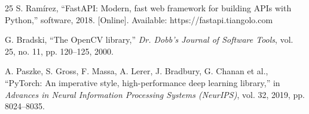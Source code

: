 \documentclass[conference]{IEEEtran}
\begin{document}
\begin{thebibliography}{25}
S. Ram\'irez, ``FastAPI: Modern, fast web framework for building APIs with Python,'' software, 2018. [Online]. Available: https://fastapi.tiangolo.com

G. Bradski, ``The OpenCV library,'' \emph{Dr. Dobb's Journal of Software Tools}, vol. 25, no. 11, pp. 120--125, 2000.

A. Paszke, S. Gross, F. Massa, A. Lerer, J. Bradbury, G. Chanan et al., ``PyTorch: An imperative style, high-performance deep learning library,'' in \emph{Advances in Neural Information Processing Systems (NeurIPS)}, vol. 32, 2019, pp. 8024--8035.
\end{thebibliography}
\end{document}
